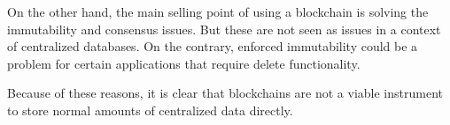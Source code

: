 \iffalse
- because in a context of centralized database, immutability and consensus as are not issues. Solving these problems is the main selling point of blockchain. Although it might be interesting that blockchain provides immutability, this could also be a problem. Some centralized databases might require delete functionality. This is no possible when using a blockchain

- not viable for storage of normal amounts of data
\fi

On the other hand, the main selling point of using a blockchain is solving the immutability and consensus issues. But these are not seen as issues in a context of centralized databases. On the contrary, enforced immutability could be a problem for certain applications that require delete functionality.

Because of these reasons, it is clear that blockchains are not a viable instrument to store normal amounts of centralized data directly.